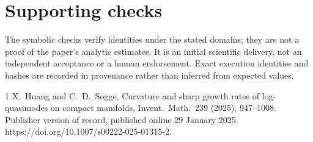 \documentclass[10pt]{article}
\begin{document}
\section*{Supporting checks}
The symbolic checks verify identities under the stated domains; they are not a proof of the paper’s analytic estimates. It is an initial scientific delivery, not an independent acceptance or a human endorsement. Exact execution identities and hashes are recorded in provenance rather than inferred from expected values.\par
1 X. Huang and C. D. Sogge, Curvature and sharp growth rates of log-quasimodes on compact manifolds, Invent. Math. 239 (2025), 947–1008. Publisher version of record, published online 29 January 2025. https://doi.org/10.1007/s00222-025-01315-2.\par
\end{document}
